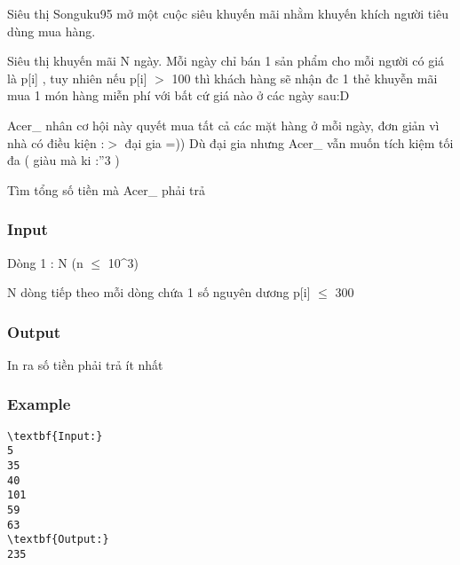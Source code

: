 

Siêu thị Songuku95 mở một cuộc siêu khuyến mãi nhằm khuyến khích người tiêu dùng mua hàng.

Siêu thị khuyến mãi N ngày. Mỗi ngày chỉ bán 1 sản phẩm cho mỗi người có giá là p[i] , tuy nhiên nếu p[i] $>$ 100 thì khách hàng sẽ nhận đc 1 thẻ khuyễn mãi mua 1 món hàng miễn phí với bất cứ giá nào ở các ngày sau:D

Acer\_ nhân cơ hội này quyết mua tất cả các mặt hàng ở mỗi ngày, đơn giản vì nhà có điều kiện :$>$ đại gia =)) Dù đại gia nhưng Acer\_ vẫn muốn tích kiệm tối đa ( giàu mà ki :”3 )

Tìm tổng số tiền mà Acer\_ phải trả

\subsubsection{Input}

Dòng 1 : N (n  $\le$  10^3)

N dòng tiếp theo mỗi dòng chứa 1 số nguyên dương p[i]  $\le$  300

\subsubsection{Output}

In ra số tiền phải trả ít nhất

\subsubsection{Example}
\begin{verbatim}
\textbf{Input:}
5
35
40
101
59
63
\textbf{Output:}
235\end{verbatim}

 
